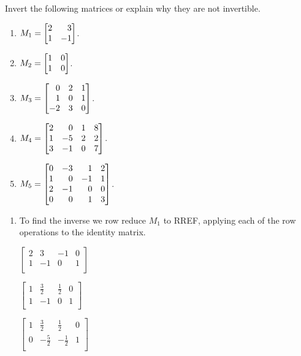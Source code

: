 \begin{exercises}
\begin{problist}
\begin{solution}
\begin{enumerate}
			\end{enumerate}
		\end{solution}


		\prob Invert the following matrices or explain why they are not invertible.
		\begin{enumerate}
			\item $M_{1} = \mat{2&3\\1&-1}$.

			\item $M_{2} = \mat{1&0\\1&0}$.

			\item $M_{3} = \mat{0&2&1\\1&0&1\\-2&3&0}$.

			\item $M_{4} = \mat{2&0&1&8\\1&-5&2&2\\3&-1&0&7}$.

			\item $M_{5} = \mat{0&-3&1&2\\1&0&-1&1\\2&-1&0&0\\0&0&1&3}$.
		\end{enumerate}

		\begin{solution}
	    \begin{enumerate}
				\item
				To find the inverse we row reduce $M_{1}$ to RREF, applying each
				of the row operations to the identity matrix.

				$\left[\begin{array}{cc|cc}
							2&3&-1&0\\
							1&-1&0&1\\
							\end{array}\right]$

				$\left[\begin{array}{cc|cc}
							1&\frac{3}{2}&\frac{1}{2}&0\\
							1&-1&0&1\\
							\end{array}\right]$

				$\left[\begin{array}{cc|cc}
							1&\frac{3}{2}&\frac{1}{2}&0\\
							0&-\frac{5}{2}&-\frac{1}{2}&1\\
							\end{array}\right]$


\end{enumerate}
\end{solution}
\end{problist}
\end{exercises}
